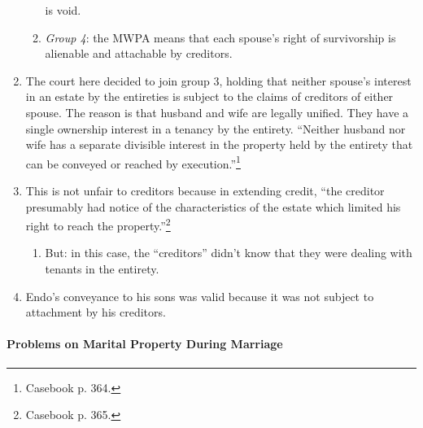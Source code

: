 \begin{enumerate}
\begin{enumerate}
        is void.
        \item \emph{Group 4}: the MWPA means that each spouse's right of 
        survivorship is alienable and attachable by creditors.
    \end{enumerate}
    \item The court here decided to join group 3, holding that neither 
    spouse's interest in an estate by the entireties is subject to the claims 
    of creditors of either spouse. The reason is that husband and wife are 
    legally unified. They have a single ownership interest in a tenancy by the 
    entirety. ``Neither husband nor wife has a separate divisible interest in 
    the property held by the entirety that can be conveyed or reached by 
    execution.''\footnote{Casebook p. 364.}
    \item This is not unfair to creditors because in extending credit, ``the 
    creditor presumably had notice of the characteristics of the estate which 
    limited his right to reach the property.''\footnote{Casebook p. 365.}
    \begin{enumerate}
        \item But: in this case, the ``creditors'' didn't know that they were 
        dealing with tenants in the entirety.
    \end{enumerate}
    \item Endo's conveyance to his sons was valid because it was not subject 
    to attachment by his creditors.
\end{enumerate}

\paragraph{Problems on Marital Property During Marriage}

